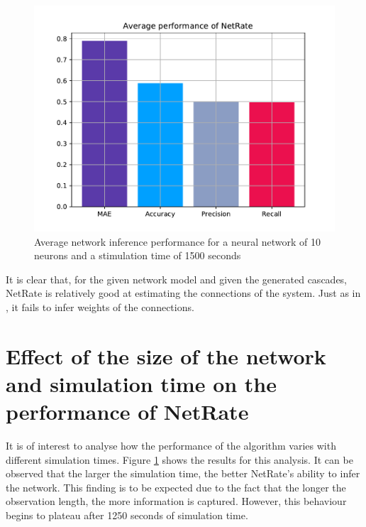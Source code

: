 \begin{figure}
	\centering
	\includegraphics[width=0.8\linewidth]{proof_suitability.pdf}
	\caption{Average network inference performance for a neural network of 10 neurons and a stimulation time of 1500 seconds}
	\label{fig:results_10_neurons}
\end{figure}

It is clear that, for the given network model and given the generated cascades, NetRate is relatively good at estimating the connections of the system. Just as in \cite{alexandru2018estimating}, it fails to infer weights of the connections.




\section{Effect of the size of the network and simulation time on the performance of NetRate}

It is of interest to analyse how the performance of the algorithm varies with different simulation times. Figure \ref{fig:results_10_neurons} shows the results for this analysis. It can be observed that the larger the simulation time, the better NetRate's ability to infer the network. This finding is to be expected due to the fact that the longer the observation length, the more information is captured. However, this behaviour begins to plateau after 1250 seconds of simulation time.\\

